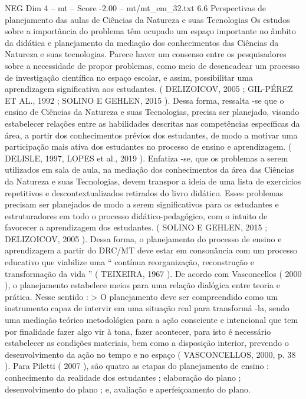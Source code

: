 \begin{textsample}{NEG Dim 4 – mt – Score -2.00 – mt/mt\_em\_32.txt}  \label{ex:f4_neg_120}
6.6 Perspectivas de planejamento das aulas de Ciências da Natureza e suas Tecnologias Os estudos sobre a importância do problema têm ocupado um espaço importante no âmbito da didática e planejamento da mediação dos conhecimentos das Ciências da Natureza e suas tecnologias.
Parece haver um consenso entre os pesquisadores sobre a necessidade de propor problemas, como meio de desencadear um processo de investigação científica no espaço escolar, e assim, possibilitar uma aprendizagem significativa aos estudantes. ( DELIZOICOV, 2005 ; GIL-PÉREZ ET AL., 1992 ; SOLINO E GEHLEN, 2015 ).
Dessa forma, ressalta -se que o ensino de Ciências da Natureza e suas Tecnologias, precisa ser planejado, visando estabelecer relações entre as habilidades descritas nas competências específicas da área, a partir dos conhecimentos prévios dos estudantes, de modo a motivar uma participação mais ativa dos estudantes no processo de ensino e aprendizagem. ( DELISLE, 1997, LOPES et al., 2019 ).
Enfatiza -se, que os problemas a serem utilizados em sala de aula, na mediação dos conhecimentos da área das Ciências da Natureza e suas Tecnologias, devem transpor a ideia de uma lista de exercícios repetitivos e descontextualizados retirados do livro didático.
Esses problemas precisam ser planejados de modo a serem significativos para os estudantes e estruturadores em todo o processo didático-pedagógico, com o intuito de favorecer a aprendizagem dos estudantes. ( SOLINO E GEHLEN, 2015 ; DELIZOICOV, 2005 ).
Dessa forma, o planejamento do processo de ensino e aprendizagem a partir do DRC/MT deve estar em consonância com um processo educativo que viabilize uma “ contínua reorganização, reconstrução e transformação da vida ” ( TEIXEIRA, 1967 ).
De acordo com Vasconcellos ( 2000 ), o planejamento estabelece meios para uma relação dialógica entre teoria e prática.
Nesse sentido : > O planejamento deve ser compreendido como um instrumento capaz de intervir em uma situação real para transformá -la, sendo uma mediação teórico metodológica para a ação consciente e intencional que tem por finalidade fazer algo vir à tona, fazer acontecer, para isto é necessário estabelecer as condições materiais, bem como a disposição interior, prevendo o desenvolvimento da ação no tempo e no espaço ( VASCONCELLOS, 2000, p. 38 ).
Para Piletti ( 2007 ), são quatro as etapas do planejamento de ensino : conhecimento da realidade dos estudantes ; elaboração do plano ; desenvolvimento do plano ; e, avaliação e aperfeiçoamento do plano.

\end{textsample}
